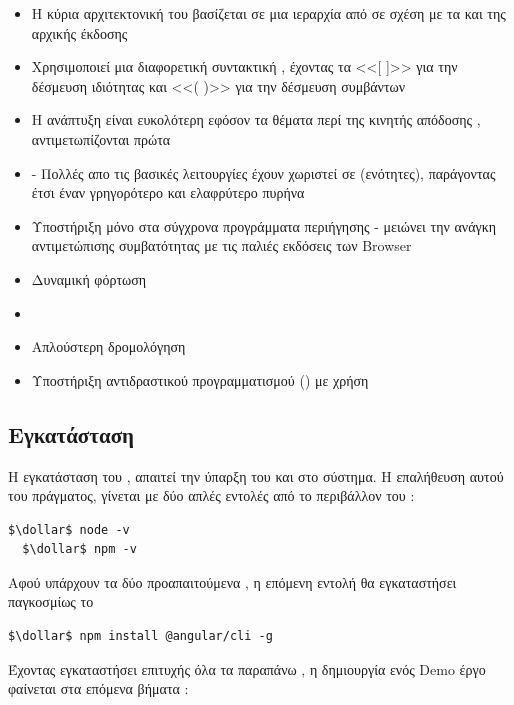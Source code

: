 \begin{itemize}
    \item Η κύρια αρχιτεκτονική του βασίζεται σε μια ιεραρχία από  σε σχέση με τα  και  της αρχικής έκδοσης
    \item Χρησιμοποιεί μια διαφορετική συντακτική , έχοντας τα <<[ ]>> για την δέσμευση ιδιότητας και <<( )>> για την δέσμευση συμβάντων
    \item Η ανάπτυξη είναι ευκολότερη εφόσον τα θέματα περί της κινητής απόδοσης , αντιμετωπίζονται πρώτα
    \item {} - Πολλές απο τις βασικές λειτουργίες έχουν χωριστεί σε  (ενότητες), παράγοντας έτσι έναν γρηγορότερο και ελαφρύτερο πυρήνα
    \item Υποστήριξη μόνο στα σύγχρονα προγράμματα περιήγησης - μειώνει την ανάγκη αντιμετώπισης συμβατότητας με τις παλιές εκδόσεις των \textlatin{Browser}
    \item Δυναμική φόρτωση
    \item {}
    \item Απλούστερη δρομολόγηση
    \item Υποστήριξη αντιδραστικού προγραμματισμού () με χρήση  
\end{itemize}

\subsection*{Εγκατάσταση}
\quad Η εγκατάσταση του  , απαιτεί την ύπαρξη του  και  στο σύστημα. Η επαλήθευση αυτού του πράγματος, γίνεται με δύο απλές εντολές από το περιβάλλον του :

\begin{lstlisting}[language=command.com]
  $\dollar$ node -v
  $\dollar$ npm -v
\end{lstlisting}

Αφού υπάρχουν τα δύο προαπαιτούμενα , η επόμενη εντολή θα εγκαταστήσει παγκοσμίως το 

\begin{lstlisting}[language=command.com]
$\dollar$ npm install @angular/cli -g
\end{lstlisting}

Έχοντας εγκαταστήσει επιτυχής όλα τα παραπάνω , η δημιουργία ενός \textlatin{Demo} έργο φαίνεται στα επόμενα βήματα :

